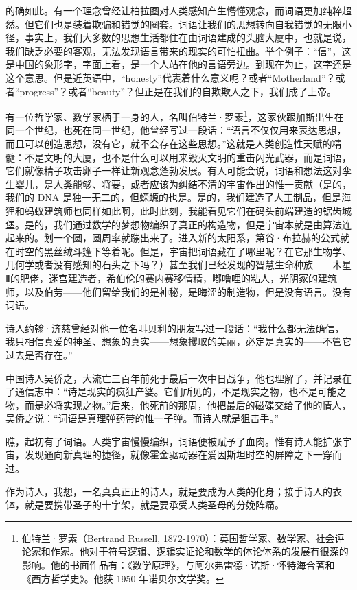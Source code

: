 \documentclass[AutoFakeBold=true]{book}
\begin{document}
的确如此。有一个理念曾经让柏拉图对人类感知产生懵懂观念，而词语更加纯粹超然。但它们也是装着欺骗和错觉的圈套。词语让我们的思想转向自我错觉的无限小径，事实上，我们大多数的思想生活都住在由词语建成的头脑大厦中，也就是说，我们缺乏必要的客观，无法发现语言带来的现实的可怕扭曲。举个例子：``信''，这是中国的象形字，字面上看，是一个人站在他的言语旁边。到现在为止，这字还是这个意思。但是近英语中，``honesty''代表着什么意义呢？或者``Motherland''？或者``progress''？或者``beauty''？但正是在我们的自欺欺人之下，我们成了上帝。

有一位哲学家、数学家栖于一身的人，名叫伯特兰·罗素\footnote{伯特兰·罗素（Bertrand Russell, 1872-1970）：英国哲学家、数学家、社会评论家和作家。他对于符号逻辑、逻辑实证论和数学的体论体系的发展有很深的影响。他的书面作品有：《数学原理》，与阿尔弗雷德·诺斯·怀特海合著和《西方哲学史》。他获 1950 年诺贝尔文学奖。}，这家伙跟加斯出生在同一个世纪，也死在同一世纪，他曾经写过一段话：``语言不仅仅用来表达思想，而且可以创造思想，没有它，就不会存在这些思想。''这就是人类创造性天赋的精髓：不是文明的大厦，也不是什么可以用来毁灭文明的重击闪光武器，而是词语，它们就像精子攻击卵子一样让新观念蓬勃发展。有人可能会说，词语和想法这对孪生婴儿，是人类能够、将要，或者应该为纠结不清的宇宙作出的惟一贡献（是的，我们的 DNA 是独一无二的，但蝾螈的也是。是的，我们建造了人工制品，但是海狸和蚂蚁建筑师也同样如此啊，此时此刻，我能看见它们在码头前端建造的锯齿城堡。是的，我们通过数学的梦想物编织了真正的构造物，但是宇宙本就是由算法连起来的。划一个圆，圆周率就蹦出来了。进入新的太阳系，第谷·布拉赫的公式就在时空的黑丝绒斗篷下等着呢。但是，宇宙把词语藏在了哪里呢？在它那生物学、几何学或者没有感知的石头之下吗？）甚至我们已经发现的智慧生命种族——木星Ⅱ的肥佬，迷宫建造者，希伯伦的赛内赛移情精，嘟噜哩的粘人，光阴冢的建筑师，以及伯劳——他们留给我们的是神秘，是晦涩的制造物，但是没有语言。没有词语。

诗人约翰·济慈曾经对他一位名叫贝利的朋友写过一段话：``我什么都无法确信，我只相信真爱的神圣、想象的真实——想象攫取的美丽，必定是真实的——不管它过去是否存在。''

中国诗人吴侨之，大流亡三百年前死于最后一次中日战争，他也理解了，并记录在了通信志中：``诗是现实的疯狂产婆。它们所见的，不是现实之物，也不是可能之物，而是必将实现之物。''后来，他死前的那周，他把最后的磁碟交给了他的情人，吴侨之说：``词语是真理弹药带的惟一子弹。而诗人就是狙击手。''

瞧，起初有了词语。人类宇宙慢慢编织，词语便被赋予了血肉。惟有诗人能扩张宇宙，发现通向新真理的捷径，就像霍金驱动器在爱因斯坦时空的屏障之下一穿而过。

作为诗人，我想，一名真真正正的诗人，就是要成为人类的化身；接手诗人的衣钵，就是要携带圣子的十字架，就是要承受人类圣母的分娩阵痛。
\end{document}
